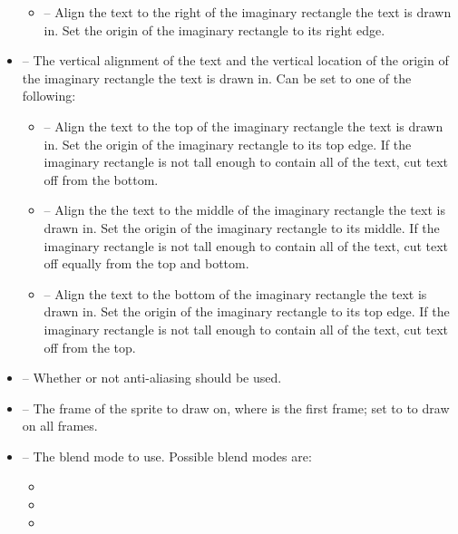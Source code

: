 \documentclass[letterpaper,10pt,english]{sphinxmanual}
\begin{document}
\begin{fulllineitems}
\begin{itemize}
\begin{itemize}
\item {} 
 -- Align the text to the right of the imaginary
rectangle the text is drawn in.  Set the origin of the
imaginary rectangle to its right edge.

\end{itemize}

\item {} 
 -- The vertical alignment of the text and the
vertical location of the origin of the imaginary rectangle the
text is drawn in.  Can be set to one of the following:
\begin{itemize}
\item {} 
 -- Align the text to the top of the imaginary
rectangle the text is drawn in.  Set the origin of the
imaginary rectangle to its top edge.  If the imaginary
rectangle is not tall enough to contain all of the text, cut
text off from the bottom.

\item {} 
 -- Align the the text to the middle of the
imaginary rectangle the text is drawn in.  Set the origin of
the imaginary rectangle to its middle.  If the imaginary
rectangle is not tall enough to contain all of the text, cut
text off equally from the top and bottom.

\item {} 
 -- Align the text  to the bottom of the
imaginary rectangle the text is drawn in.  Set the origin of
the imaginary rectangle to its top edge.  If the imaginary
rectangle is not tall enough to contain all of the text, cut
text off from the top.

\end{itemize}

\item {} 
 -- Whether or not anti-aliasing should be used.

\item {} 
 -- The frame of the sprite to draw on, where 
is the first frame; set to  to draw on all
frames.

\item {} 
 -- The blend mode to use.  Possible blend modes
are:
\begin{itemize}
\item {} 

\item {} 

\item {} 


\end{itemize}
\end{itemize}
\end{fulllineitems}
\end{document}

